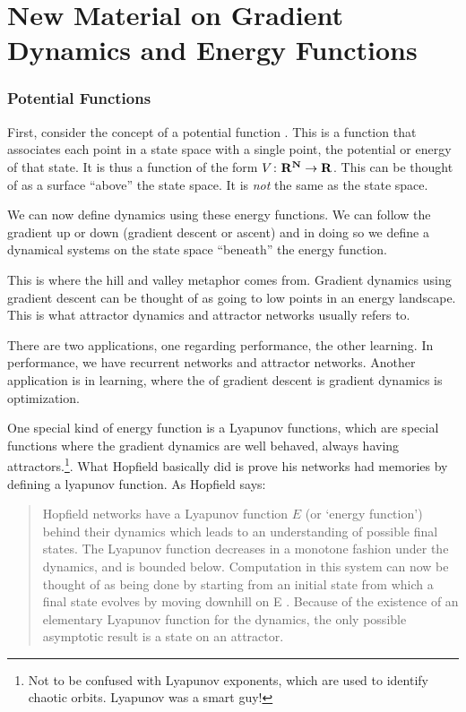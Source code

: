 \chapter{New Material on Gradient Dynamics and Energy Functions}


\subsection{Potential Functions}

First, consider the concept of a potential function . This is a function that associates each point in a state space with a single point, the potential or energy of that state.  It is thus a function of the form $V \colon \bf{R}^N \to 
\bf{R}$.  This can be thought of as a surface ``above'' the state space. It is \emph{not} the same as the state space. 

We can now define dynamics using these energy functions. We can follow the gradient up or down (gradient descent or ascent) and in doing so we define a dynamical systems on the state space ``beneath'' the energy function. 

This is where the hill and valley metaphor comes from. Gradient dynamics using gradient descent can be thought of as going to low points in an energy landscape.  This is what attractor dynamics and attractor networks usually refers to.

There are two applications, one regarding performance, the other learning. In performance, we have recurrent networks and attractor networks. Another application is in learning, where the of gradient descent is gradient dynamics is optimization.

One special kind of energy function is a  Lyapunov functions, which are special functions where the gradient dynamics are well behaved, always having attractors.\footnote{Not to be confused with Lyapunov exponents, which are used to identify chaotic orbits. Lyapunov was a smart guy!}.  What Hopfield basically did is prove his networks had memories by defining a lyapunov function. As Hopfield says:

\begin{quote}
Hopfield networks have a Lyapunov function $E$ (or `energy function') behind their dynamics which leads to an understanding of possible final states. The Lyapunov function decreases in a monotone fashion under the dynamics, and is bounded below. Computation in this system can now be thought of as being done by starting from an initial state from which a final state evolves by moving downhill on E . Because of the existence of an elementary Lyapunov function for the dynamics, the only possible asymptotic result is a state on an attractor. 
\end{quote}

